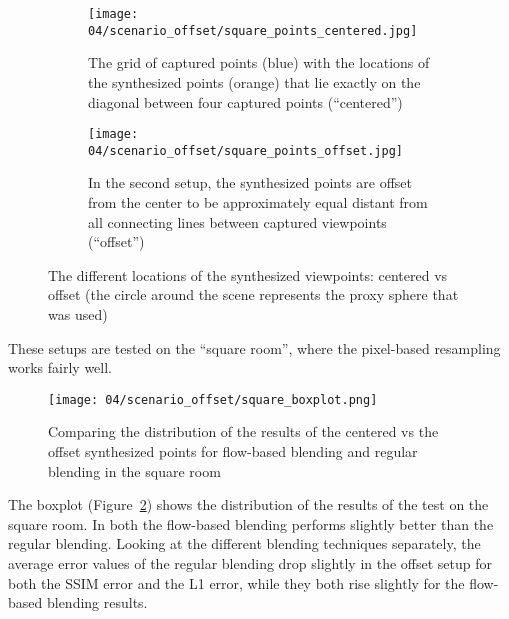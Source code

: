 \begin{figure}
\centering
    \hfill
    \begin{subfigure}[t]{0.5\textwidth}
            \centering
            \texttt{[image: 04/scenario\_offset/square\_points\_centered.jpg]}
            \caption{The grid of captured points (blue) with the locations of the synthesized points (orange) that lie exactly on the diagonal between four captured points (``centered'')}
    \end{subfigure}%
    \hfill
    \begin{subfigure}[t]{0.5\textwidth}
            \centering
            \texttt{[image: 04/scenario\_offset/square\_points\_offset.jpg]}
            \caption{In the second setup, the synthesized points are offset from the center to be approximately equal distant from all connecting lines between captured viewpoints (``offset'')}
    \end{subfigure}
    \hfill
    \hfill
  \caption[The different locations of the synthesized viewpoints]{The different locations of the synthesized viewpoints: centered vs offset (the circle around the scene represents the proxy sphere that was used)} \label{fig:offset_setup}
\end{figure}

These setups are tested on the ``square room'', where the pixel-based resampling works fairly well. 


\begin{figure}
		\centering
		\texttt{[image: 04/scenario\_offset/square\_boxplot.png]}
		\caption[The distribution of results with centered vs offset synthesized points]{Comparing the distribution of the results of the centered vs the offset synthesized points for flow-based blending and regular blending in the square room}
		\label{fig:scenario_offset_boxplot}
\end{figure}

The boxplot (Figure~\ref{fig:scenario_offset_boxplot}) shows the distribution of the results of the test on the square room. In both the flow-based blending performs slightly better than the regular blending. Looking at the different blending techniques separately, the average error values of the regular blending drop slightly in the offset setup for both the SSIM error and the L1 error, while they both rise slightly for the flow-based blending results.


